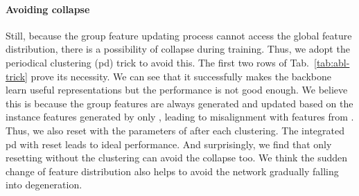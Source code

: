 \documentclass[runningheads]{style/llncs}
\begin{document}
\paragraph{Avoiding collapse}
Still, because the group feature updating process cannot access the global feature distribution, there is a possibility of collapse during training. Thus, we adopt the periodical clustering (pd) trick to avoid this. The first two rows of Tab.~\ref{tab:abl-trick} prove its necessity. We can see that it successfully makes the backbone learn useful representations but the performance is not good enough. We believe this is because the group features are always generated and updated based on the instance features generated by only , leading to misalignment with features from . Thus, we also reset  with the parameters of  after each clustering. The integrated pd with  reset leads to ideal performance. And surprisingly, we find that only resetting  without the clustering can avoid the collapse too. We think the sudden change of  feature distribution also helps to avoid the network gradually falling into degeneration. 
\end{document}
